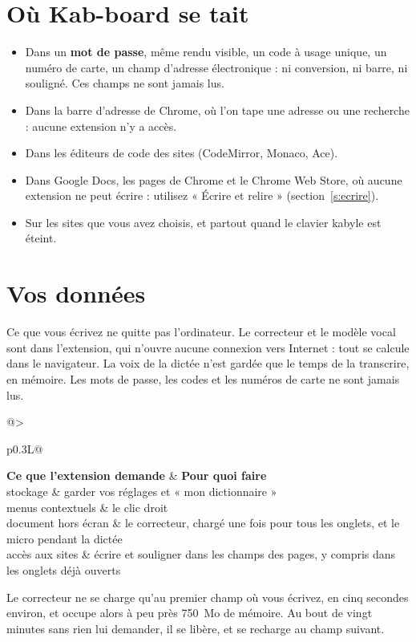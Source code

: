\documentclass[11pt,a4paper]{article}
\makeatletter
\newcommand{\tableau}[3]{%
  \par\noindent\begin{tabularx}{\linewidth}{@{}>{\raggedright\arraybackslash}p{#1}L@{}}
  \toprule #2 \\ \midrule #3 \bottomrule
  \end{tabularx}\par}
\makeatother
\begin{document}
\section{Où Kab-board se tait}\label{s:tait}
\begin{itemize}
  \item Dans un \textbf{mot de passe}, même rendu visible, un code à usage unique, un numéro de carte, un champ d'adresse électronique : ni conversion, ni barre, ni souligné. Ces champs ne sont jamais lus.
  \item Dans la barre d'adresse de Chrome, où l'on tape une adresse ou une recherche : aucune extension n'y a accès.
  \item Dans les éditeurs de code des sites (CodeMirror, Monaco, Ace).
  \item Dans Google Docs, les pages de Chrome et le Chrome Web Store, où aucune extension ne peut écrire : utilisez « Écrire et relire » (section~\ref{s:ecrire}).
  \item Sur les sites que vous avez choisis, et partout quand le clavier kabyle est éteint.
\end{itemize}

\section{Vos données}\label{s:donnees}
Ce que vous écrivez ne quitte pas l'ordinateur. Le correcteur et le modèle vocal sont dans l'extension, qui n'ouvre aucune connexion vers Internet : tout se calcule dans le navigateur. La voix de la dictée n'est gardée que le temps de la transcrire, en mémoire. Les mots de passe, les codes et les numéros de carte ne sont jamais lus.

\medskip
\tableau{0.3\linewidth}{\textbf{Ce que l'extension demande} & \textbf{Pour quoi faire}}{%
stockage & garder vos réglages et « mon dictionnaire » \\
menus contextuels & le clic droit \\
document hors écran & le correcteur, chargé une fois pour tous les onglets, et le micro pendant la dictée \\
accès aux sites & écrire et souligner dans les champs des pages, y compris dans les onglets déjà ouverts \\}

\medskip
Le correcteur ne se charge qu'au premier champ où vous écrivez, en cinq secondes environ, et occupe alors à peu près 750~Mo de mémoire. Au bout de vingt minutes sans rien lui demander, il se libère, et se recharge au champ suivant.
\end{document}
